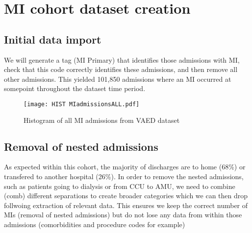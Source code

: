 \documentclass[11pt]{article}
\begin{document}
\pagebreak

\section{MI cohort dataset creation}
\subsection{Initial data import}
We will generate a tag (MI Primary) that identifies those admissions with MI, check that this code correctly identifies these admissions, and then remove all other admissions. This yielded 101,850 admissions where an MI occurred at somepoint throughout the dataset time period. 
\color{violet} 	
\begin{stlog}\end{stlog}
\color{black}
\begin{figure} [h]
	\centering
	\texttt{[image: HIST MIadmissionsALL.pdf]}
	\caption{Histogram of all MI admissions from VAED dataset}
	\label{All_MI_admissions}
\end{figure}

\subsection{Removal of nested admissions}
\color{violet}
\begin{stlog}\end{stlog}
\color{black}
As expected within this cohort, the majority of discharges are to home (68\%) or transfered to another hospital (26\%). In order to remove the nested admissions, such as patients going to dialysis or from CCU to AMU, we need to combine (comb) different separations to create broader categories which we can then drop follwoing extraction of relevant data. This ensures we keep the correct number of MIs (removal of nested admissions) but do not lose any data from within those admissions (comorbidities and procedure codes for example)
\end{document}
